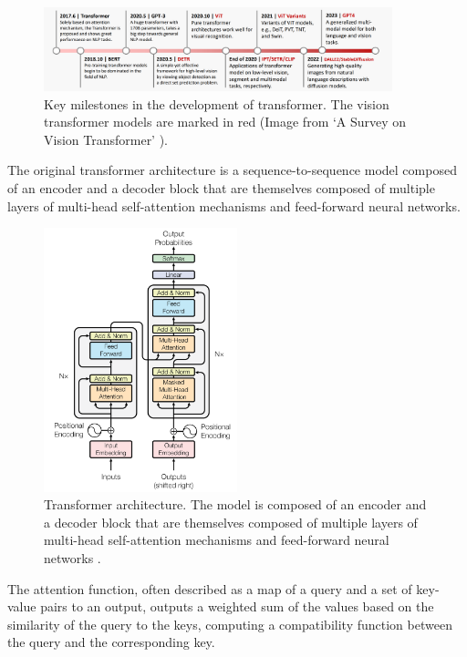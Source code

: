 \documentclass[english, 12pt, a4paper, elec, utf8, a-2b, online]{aaltothesis}
\begin{document}
\begin{figure}[H]
    \centering
    \includegraphics[width=0.9\textwidth]{images/transformers_milestones.png}
    \caption{Key milestones in the development of transformer.
    The vision transformer models are marked in red (Image from `A Survey on Vision Transformer' \cite{Han2023}).}
    \label{fig:transformers_milestones}
\end{figure}

The original transformer architecture \cite{Vaswani2017} is a sequence-to-sequence model composed of an encoder and a decoder block that are themselves composed of multiple layers of multi-head self-attention mechanisms and feed-forward neural networks.

\begin{figure}[H]
    \centering
    \includegraphics[width=0.5\textwidth]{images/transformer_architecture.png}
    \caption{Transformer architecture.
    The model is composed of an encoder and a decoder block that are themselves composed of multiple layers of multi-head self-attention mechanisms and feed-forward neural networks \cite{Vaswani2017}.}
    \label{fig:transformers_architecture}
\end{figure}

The attention function, often described as a map of a query and a set of key-value pairs to an output, outputs a weighted sum of the values based on the similarity of the query to the keys, computing a compatibility function between the query and the corresponding key.
\end{document}
